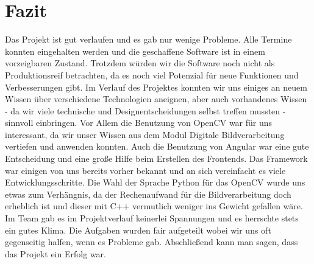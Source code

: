 \chapter{Fazit}
Das Projekt ist gut verlaufen und es gab nur wenige Probleme. Alle Termine konnten eingehalten werden und die geschaffene Software ist in einem vorzeigbaren Zustand. Trotzdem würden wir die Software noch nicht als Produktionsreif betrachten, da es noch viel Potenzial für neue Funktionen und Verbesserungen gibt.
Im Verlauf des Projektes konnten wir uns einiges an neuem Wissen über verschiedene Technologien aneignen, aber auch vorhandenes Wissen - da wir viele technische und Designentscheidungen selbst treffen mussten - sinnvoll einbringen. Vor Allem die Benutzung von OpenCV war für uns interessant, da wir unser Wissen aus dem Modul Digitale Bildverarbeitung vertiefen und anwenden konnten. Auch die Benutzung von Angular war eine gute Entscheidung und eine große Hilfe beim Erstellen des Frontends. Das Framework war einigen von uns bereits vorher bekannt und an sich vereinfacht es viele Entwicklungsschritte.
Die Wahl der Sprache Python für das OpenCV wurde uns etwas zum Verhängnis, da der Rechenaufwand für die Bildverarbeitung doch erheblich ist und dieser mit C++ vermutlich weniger ins Gewicht gefallen wäre. 
Im Team gab es im Projektverlauf keinerlei Spannungen und es herrschte stets ein gutes Klima. Die Aufgaben wurden fair aufgeteilt wobei wir uns oft gegenseitig halfen, wenn es Probleme gab.
Abschließend kann man sagen, dass das Projekt ein Erfolg war.